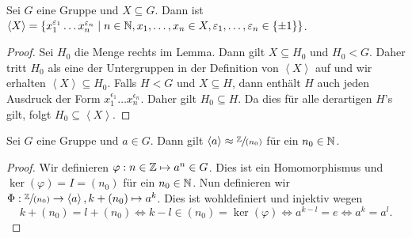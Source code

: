 \begin{lemma}
	Sei $G$ eine Gruppe und $X \subseteq G$. Dann ist $\left< X \right> = 
	\{x_{1}^{\varepsilon_1}\ldots x_{n}^{\varepsilon_{n}} \mid n \in \mathbb{N}, x_1,\ldots,x_{n} \in X, \varepsilon_1,\ldots,\varepsilon_{n} \in \{\pm 1\} \} $.
\end{lemma}

\begin{proof}
	Sei $H_0$ die Menge rechts im Lemma. Dann gilt $X \subseteq H_0$ und $H_0 < G$.
	Daher tritt $H_0$ als eine der Untergruppen in der Definition von $\left< X \right>$ auf und wir erhalten $\left< X \right> \subseteq H_0$.
	Falls $H < G$ und $X \subseteq H$, dann enthält $H$ auch jeden Ausdruck der Form $x_1^{\epsilon_1} \ldots x_{n}^{\epsilon_{n}}$.
	Daher gilt $H_0 \subseteq H$. Da dies für alle derartigen $H$'s gilt, folgt $H_0 \subseteq \left< X \right>$.
\end{proof}

\begin{lemma}
	Sei $G$ eine Gruppe und $a \in G$. Dann gilt $\left< a \right> \approx \sfrac{\mathbb{Z}}{(n_0)}$ für ein $n_0 \in \mathbb{N}$.
\end{lemma}

\begin{proof}
	Wir definieren $\varphi: n \in \mathbb{Z} \mapsto a^{n} \in G$. Dies ist ein Homomorphismus und $\ker(\varphi) = I = (n_0)$ für ein $n_0 \in \mathbb{N}$.
	Nun definieren wir $\Phi: \sfrac{\mathbb{Z}}{(n_0)} \to  \left< a \right>, k+(n_0) \mapsto a^{k}$.
	Dies ist wohldefiniert und injektiv wegen
	\[
		k+(n_0) = l+(n_0) \Leftrightarrow k-l \in (n_0) = \ker(\varphi) \Leftrightarrow a^{k-l} = e \Leftrightarrow a^{k} = a^{l}
	.\] 
\end{proof}

